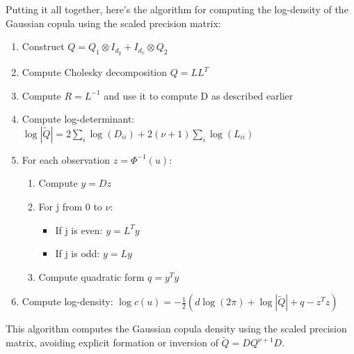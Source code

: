 \documentclass[journal=,manuscript=]{achemso}
\providecommand{\tightlist}{%
  \setlength{\itemsep}{0pt}\setlength{\parskip}{0pt}}\usepackage{longtable,booktabs,array}
\begin{document}
Putting it all together, here's the algorithm for computing the
log-density of the Gaussian copula using the scaled precision matrix:

\begin{enumerate}
\def\labelenumi{\arabic{enumi}.}
\tightlist
\item
  Construct \(Q = Q_1 \otimes I_{d_y} + I_{d_x} \otimes Q_2\)
\item
  Compute Cholesky decomposition \(Q = LL^T\)
\item
  Compute \(R = L^{-1}\) and use it to compute D as described earlier
\item
  Compute log-determinant:
  \(\log|\tilde{Q}| = 2\sum_i \log(D_{ii}) + 2(\nu+1)\sum_i \log(L_{ii})\)
\item
  For each observation \(z = \Phi^{-1}(u)\):

  \begin{enumerate}
  \def\labelenumii{\roman{enumii})}
  \tightlist
  \item
    Compute \(y = Dz\)
  \item
    For j from 0 to \(\nu\):

    \begin{itemize}
    \tightlist
    \item
      If j is even: \(y = L^Ty\)
    \item
      If j is odd: \(y = Ly\)
    \end{itemize}
  \item
    Compute quadratic form \(q = y^Ty\)
  \end{enumerate}
\item
  Compute log-density:
  \(\log c(u) = -\frac{1}{2}(d\log(2\pi) + \log|\tilde{Q}| + q - z^Tz)\)
\end{enumerate}

This algorithm computes the Gaussian copula density using the scaled
precision matrix, avoiding explicit formation or inversion of
\(\tilde Q = DQ^{\nu + 1}D\).
\end{document}
